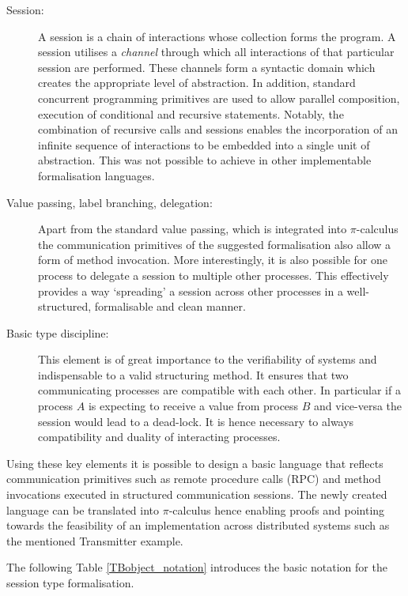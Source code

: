 \begin{description}
  \item[Session:] A session is a chain of interactions whose collection forms the program. A session utilises a \textit{channel} through which all interactions of that particular session are performed. These channels form a syntactic domain which creates the appropriate level of abstraction. In addition, standard concurrent programming primitives are used to allow parallel composition, execution of conditional and recursive statements. Notably, the combination of recursive calls and sessions enables the incorporation of an infinite sequence of interactions to be embedded into a single unit of abstraction. This was not possible to achieve in other implementable formalisation languages.
  \item[Value passing, label branching, delegation:] Apart from the standard value passing, which is integrated into $\pi$-calculus the communication primitives of the suggested formalisation also allow a form of method invocation. More interestingly, it is also possible for one process to delegate a session to multiple other processes. This effectively provides a way `spreading' a session across other processes in a well-structured, formalisable and clean manner.
  \item[Basic type discipline:] This element is of great importance to the verifiability of systems and indispensable to a valid structuring method. It ensures that two communicating processes are compatible with each other. In particular if a process $A$ is expecting to receive a value from process $B$ and vice-versa the session would lead to a dead-lock. It is hence necessary to always compatibility and duality of interacting processes.
\end{description}

Using these key elements it is possible to design a basic language that reflects communication primitives such as remote procedure calls (RPC) and method invocations executed in structured communication sessions. The newly created language can be translated into $\pi$-calculus hence enabling proofs and pointing towards the feasibility of an implementation across distributed systems such as the mentioned Transmitter example.

The following Table \ref{TBobject_notation} introduces the basic notation for the session type formalisation.

